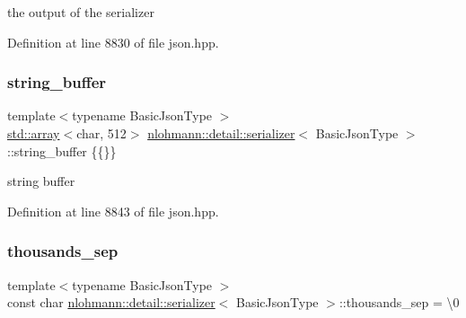 the output of the serializer 



Definition at line 8830 of file json.\+hpp.

\mbox{\label{classnlohmann_1_1detail_1_1serializer_a9c9b7ca63a66e59e5e7ffe8a2acf5c8f}} 
\subsubsection{\texorpdfstring{string\+\_\+buffer}{string\_buffer}}
{\footnotesize\ttfamily template$<$typename Basic\+Json\+Type $>$ \\
\hyperlink{namespacenlohmann_1_1detail_a1ed8fc6239da25abcaf681d30ace4985af1f713c9e000f5d3f280adbd124df4f5}{std\+::array}$<$char, 512$>$ \hyperlink{classnlohmann_1_1detail_1_1serializer}{nlohmann\+::detail\+::serializer}$<$ Basic\+Json\+Type $>$\+::string\+\_\+buffer \{\{\}\}\hspace{0.3cm}{\ttfamily [private]}}



string buffer 



Definition at line 8843 of file json.\+hpp.

\mbox{\label{classnlohmann_1_1detail_1_1serializer_a78a6ae833bb6cf7f00cb0d51db114b14}} 
\subsubsection{\texorpdfstring{thousands\+\_\+sep}{thousands\_sep}}
{\footnotesize\ttfamily template$<$typename Basic\+Json\+Type $>$ \\
const char \hyperlink{classnlohmann_1_1detail_1_1serializer}{nlohmann\+::detail\+::serializer}$<$ Basic\+Json\+Type $>$\+::thousands\+\_\+sep = \textquotesingle{}\textbackslash{}0\textquotesingle{}\hspace{0.3cm}{\ttfamily [private]}}



